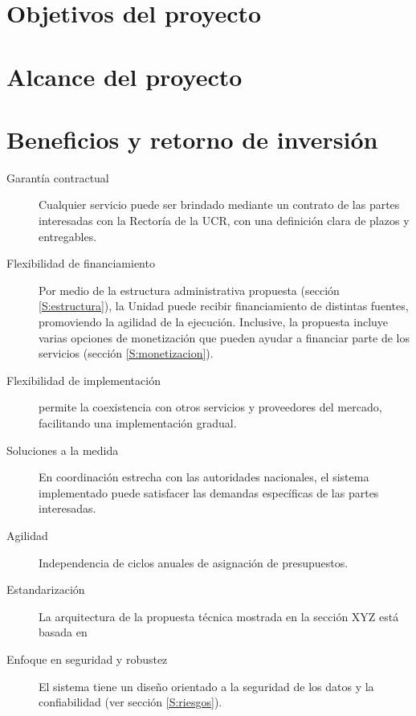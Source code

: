 \documentclass{report}
\begin{document}
\section{Objetivos del proyecto}

\section{Alcance del proyecto}



\section{Beneficios y retorno de inversión}

\begin{description}
    \item[Garantía contractual] Cualquier servicio puede ser brindado mediante un contrato de las partes interesadas con la Rectoría de la UCR, con una definición clara de plazos y entregables.
    
    \item[Flexibilidad de financiamiento] Por medio de la estructura administrativa propuesta (sección \ref{S:estructura}), la Unidad puede recibir financiamiento de distintas fuentes, promoviendo la agilidad de la ejecución. Inclusive, la propuesta incluye varias opciones de monetización que pueden ayudar a financiar parte de los servicios (sección \ref{S:monetizacion}).

    \item[Flexibilidad de implementación] permite la coexistencia con otros servicios y proveedores del mercado, facilitando una implementación gradual.

    \item[Soluciones a la medida] En coordinación estrecha con las autoridades nacionales, el sistema implementado puede satisfacer las demandas específicas de las partes interesadas.

    \item[Agilidad] Independencia de ciclos anuales de asignación de presupuestos.

    \item[Estandarización] La arquitectura de la propuesta técnica mostrada en la sección XYZ está basada en

    \item[Enfoque en seguridad y robustez] El sistema tiene un diseño orientado a la seguridad de los datos y la confiabilidad (ver sección \ref{S:riesgos}).


\end{description}
\end{document}
